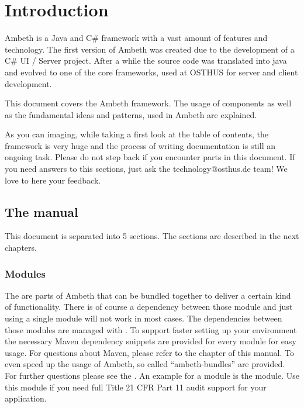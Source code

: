 \chapter{Introduction}
\label{Introduction}


Ambeth is a Java and C\# framework with a vast amount of features and technology. The first version of Ambeth was created due to the development
of a C\# UI / Server project. After a while the source code was translated into java and evolved to one of the core frameworks, used at OSTHUS\textsuperscript{\textregistered} for server and client development.

This document covers the Ambeth framework. The usage of components as well as the fundamental ideas and patterns, used in Ambeth are explained.

As you can imaging, while taking a first look at the table of contents, the framework is very huge and the process of writing documentation is still an ongoing task. Please do not step back if you encounter \TODO parts in this document. If you need answers to this sections, just ask the technology@osthus.de team! We love to here your feedback.

\section{The manual}
This document is separated into 5 sections. The sections are described in the next chapters.
\subsection{Modules}

The  are parts of Ambeth that can be bundled together to deliver a certain kind of functionality. There is of course a dependency between those module and 
just using a single module will not work in most cases. The dependencies between those modules are managed with . To support faster setting up your environment the
necessary Maven dependency snippets are provided for every module for easy usage. For questions about Maven, please refer to the  chapter of this manual.
To even speed up the usage of Ambeth, so called ``ambeth-bundles'' are provided. For further questions please see the .
An example for a module is the  module. Use this module if you need full  Title 21 CFR Part 11 audit support for your application.

